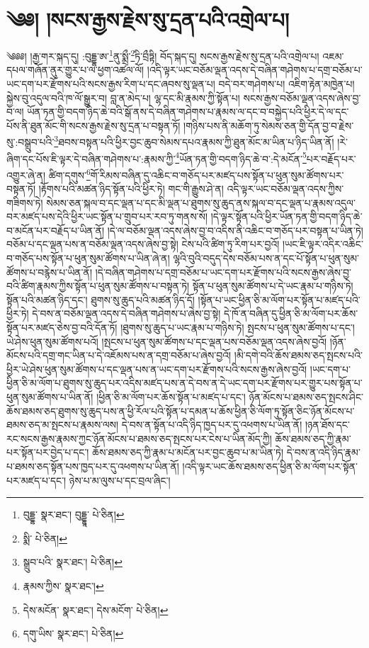 \setcounter{footnote}{0} 
\chapter{༄༅། །སངས་རྒྱས་རྗེས་སུ་དྲན་པའི་འགྲེལ་པ།}༄༅༅། །རྒྱ་གར་སྐད་དུ། :བུདྡྷ་ཨ་\footnote{བུདྡྷ་  སྣར་ཐང་། བུདྡྷཱ་  པེ་ཅིན། }ནུ་སྨྲྀ་\footnote{སྨི་  པེ་ཅིན། }ཏི་བྲྀཏྟི། བོད་སྐད་དུ། སངས་རྒྱས་རྗེས་སུ་དྲན་པའི་འགྲེལ་པ། འཇམ་དཔལ་གཞོན་ནུར་གྱུར་པ་ལ་ཕྱག་འཚལ་ལོ། །འདི་ལྟར་ཡང་བཅོམ་ལྡན་འདས་དེ་བཞིན་གཤེགས་པ་དགྲ་བཅོམ་པ་ཡང་དག་པར་རྫོགས་པའི་སངས་རྒྱས་རིག་པ་དང་ཞབས་སུ་ལྡན་པ། བདེ་བར་གཤེགས་པ། འཇིག་རྟེན་མཁྱེན་པ། སྐྱེས་བུ་འདུལ་བའི་ཁ་ལོ་སྒྱུར་བ། བླ་ན་མེད་པ། ལྷ་དང་མི་རྣམས་ཀྱི་སྟོན་པ། སངས་རྒྱས་བཅོམ་ལྡན་འདས་ཞེས་བྱ་བ་ལ། ཡོན་ཏན་གྱི་བདག་ཉིད་ཆེ་བའི་སྒོ་ནས་དེ་བཞིན་གཤེགས་པ་རྣམས་ལ་དང་བ་བསྐྱེད་པའི་ཕྱིར་དེ་ལ་དང་པོས་ནི་ཐུན་མོང་གི་སངས་རྒྱས་རྗེས་སུ་དྲན་པ་བསྟན་ཏོ། །གཉིས་པས་ནི་མཆོག་ཏུ་སེམས་ཅན་གྱི་དོན་བྱ་བ་རྗེས་སུ་:བསྒྲུབ་པའི་\footnote{སྒྲུབ་པའི་  སྣར་ཐང་།  པེ་ཅིན། }ཐབས་བསྟན་པའི་ཕྱིར་བྱང་ཆུབ་སེམས་དཔའ་རྣམས་ཀྱི་ཐུན་མོང་མ་ཡིན་པ་ཉིད་ཡིན་ནོ། །རེ་ཞིག་དང་པོས་ཇི་ལྟར་དེ་བཞིན་གཤེགས་པ་:རྣམས་ཀྱི་\footnote{རྣམས་ཀྱིས་  སྣར་ཐང་། }ཡོན་ཏན་གྱི་བདག་ཉིད་ཆེ་བ་:དེ་མངོན་\footnote{དེས་མངོན་  སྣར་ཐང་། དེས་མངོག་  པེ་ཅིན། }པར་བརྗོད་པར་འགྱུར་ཞེ་ན། ཚིག་དགུས་\footnote{དགུ་ཡིས་  སྣར་ཐང་།  པེ་ཅིན། }གོ་རིམས་བཞིན་དུ་འཆིང་བ་གཅོད་པར་མཛད་པས་སྟོན་པ་ཕུན་སུམ་ཚོགས་པར་བསྟན་ཏོ། །རྟོགས་པའི་མཚན་ཉིད་སྟོན་པའི་ཕྱིར་ཏེ། གང་གི་རྒྱུས་ཤེ་ན། འདི་ལྟར་ཡང་བཅོམ་ལྡན་འདས་ཀྱིས་གཟིགས་ཏེ། སེམས་ཅན་སྐལ་བ་དང་ལྡན་པ་དང་མི་ལྡན་པ་ཐུགས་སུ་ཆུད་ནས་སྐལ་བ་དང་ལྡན་པ་རྣམས་འདུལ་བར་མཛད་པས་དེའི་ཕྱིར་ཡང་སྟོན་པ་གྲུབ་པར་རབ་ཏུ་གནས་སོ། །དེ་ལྟར་སྟོན་པའི་ཕྱིར་ཡོན་ཏན་གྱི་བདག་ཉིད་ཆེ་བ་མངོན་པར་བརྗོད་པ་ཡིན་ནོ། །དེ་ལ་བཅོམ་ལྡན་འདས་ཞེས་བྱ་བ་འདིས་ནི་འཆིང་བ་གཅོད་པར་བསྟན་པ་ཡིན་ཏེ། བཅོམ་པ་དང་ལྡན་པས་ན་བཅོམ་ལྡན་འདས་ཞེས་བྱ་སྟེ། ངེས་པའི་ཚིག་ཏུ་རིག་པར་བྱའོ། །ཡང་ཇི་ལྟར་འདིར་འཆིང་བ་གཅོད་པས་སྟོན་པ་ཕུན་སུམ་ཚོགས་པ་ཡིན་ཞེ་ན། ལྷའི་བུའི་བདུད་དེས་བཅོམ་པས་ན་དང་པོ་སྟོན་པ་ཕུན་སུམ་ཚོགས་པ་བརྙེས་པ་ཡིན་ནོ། །དེ་བཞིན་གཤེགས་པ་དགྲ་བཅོམ་པ་ཡང་དག་པར་རྫོགས་པའི་སངས་རྒྱས་ཞེས་བྱ་བའི་ཚིག་རྣམས་ཀྱིས་སྟོན་པ་ཕུན་སུམ་ཚོགས་པ་བསྟན་ཏེ། སྟོན་པ་ཕུན་སུམ་ཚོགས་པ་དེ་ཡང་རྣམ་པ་གཉིས་ཏེ། སྟོན་པའི་མཚན་ཉིད་དང་། ཐུགས་སུ་ཆུད་པའི་མཚན་ཉིད་དོ། །སྟོན་པ་ཡང་ཕྱིན་ཅི་མ་ལོག་པར་སྟོན་པ་མཛད་པའི་ཕྱིར་ཏེ། དེ་བས་ན་བཅོམ་ལྡན་འདས་དེ་བཞིན་གཤེགས་པ་ཞེས་བྱ་སྟེ། དེ་ཁོ་ན་བཞིན་དུ་ཕྱིན་ཅི་མ་ལོག་པར་ཆོས་སྟོན་པར་མཛད་ཅེས་བྱ་བའི་དོན་ཏོ། །ཐུགས་སུ་ཆུད་པ་ཡང་རྣམ་པ་གཉིས་ཏེ། སྤངས་པ་ཕུན་སུམ་ཚོགས་པ་དང་། ཡེ་ཤེས་ཕུན་སུམ་ཚོགས་པའོ། །སྤངས་པ་ཕུན་སུམ་ཚོགས་པ་དང་ལྡན་པས་བཅོམ་ལྡན་འདས་ཞེས་བྱའོ། །ཉོན་མོངས་པའི་དགྲ་གང་ཡིན་པ་དེ་འཇོམས་པས་ན་དགྲ་བཅོམ་པ་ཞེས་བྱའོ། །མི་དགེ་བའི་ཆོས་ཐམས་ཅད་སྤངས་པའི་ཕྱིར་ཡེ་ཤེས་ཕུན་སུམ་ཚོགས་པ་དང་ལྡན་པས་ན་ཡང་དག་པར་རྫོགས་པའི་སངས་རྒྱས་ཞེས་བྱའོ། །ཡང་དག་པ་ཕྱིན་ཅི་མ་ལོག་པ་ཐུགས་སུ་ཆུད་པར་འདིས་མཛད་པས་ན་དེ་བས་ན་དེ་ཡང་དག་པར་རྫོགས་པར་གྱུར་པས་སྟོན་པ་ཕུན་སུམ་ཚོགས་པ་ཡིན་ནོ། །ཕྱིན་ཅི་མ་ལོག་པར་ཆོས་སྟོན་པ་མཛད་པ་དང་། ཉོན་མོངས་པ་ཐམས་ཅད་སྤངས་ཤིང་ཆོས་ཐམས་ཅད་ཐུགས་སུ་ཆུད་པས་ན་ཕྱི་རོལ་པའི་སྟོན་པ་དམན་པ་ཆོས་ཕྱིན་ཅི་ལོག་ཏུ་སྟོན་ཅིང་ཉོན་མོངས་པ་ཐམས་ཅད་མ་སྤངས་པ་རྣམས་ལས། དེ་བས་ན་སྟོན་པ་འདི་ཉིད་ཁྱད་པར་དུ་འཕགས་པ་ཡིན་ནོ། །ཉན་ཐོས་དང་རང་སངས་རྒྱས་རྣམས་ཀྱང་ཉོན་མོངས་པ་ཐམས་ཅད་སྤངས་པར་ངེས་པ་ཡིན་མོད་ཀྱི། ཆོས་ཐམས་ཅད་ཀྱི་རྣམ་པར་སྟོན་པར་བྱེད་པ་དང་། ཆོས་ཐམས་ཅད་ཀྱི་རྣམ་པ་མངོན་པར་བྱང་ཆུབ་པ་མ་ཡིན་ཏེ། དེ་བས་ན་འདི་ཉིད་རྣམ་པ་ཐམས་ཅད་སྟོན་པས་ཁྱད་པར་དུ་འཕགས་པ་ཡིན་ནོ། །འདི་ལྟར་ཡང་ཆོས་ཐམས་ཅད་ཕྱིན་ཅི་མ་ལོག་པར་སྟོན་པར་མཛད་པ་དང་། ཉེས་པ་མ་ལུས་པ་དང་བྲལ་ཞིང་། 